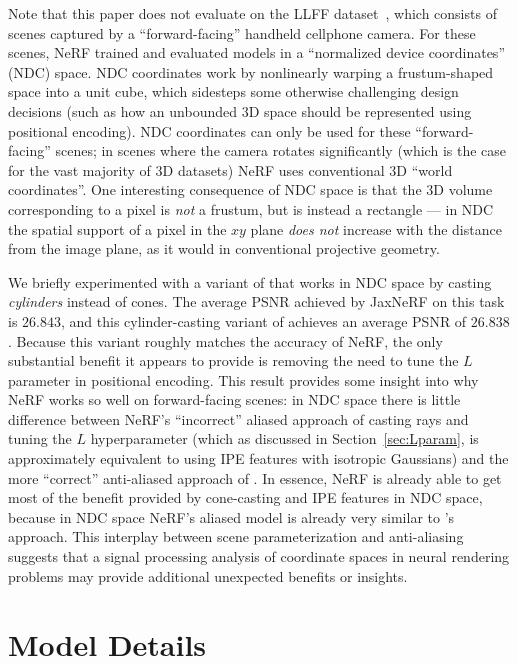 \documentclass[10pt,twocolumn,letterpaper]{article}
\begin{document}
Note that this paper does not evaluate on the LLFF dataset~\cite{mildenhall2019}, which consists of scenes captured by a ``forward-facing'' handheld cellphone camera. For these scenes, NeRF trained and evaluated models in a ``normalized device coordinates'' (NDC) space. NDC coordinates work by nonlinearly warping a frustum-shaped space into a unit cube, which sidesteps some otherwise challenging design decisions (such as how an unbounded 3D space should be represented using positional encoding). NDC coordinates can only be used for these ``forward-facing'' scenes; in scenes where the camera rotates significantly (which is the case for the vast majority of 3D datasets) NeRF uses conventional 3D ``world coordinates''.
One interesting consequence of NDC space is that the 3D volume corresponding to a pixel is \emph{not} a frustum, but is instead a rectangle --- in NDC the spatial support of a pixel in the $xy$ plane \emph{does not} increase with the distance from the image plane, as it would in conventional projective geometry.

We briefly experimented with a variant of \shortmodelnamelower that works in NDC space by casting \emph{cylinders} instead of cones.
The average PSNR achieved by JaxNeRF on this task is $26.843$, and this cylinder-casting variant of \shortmodelnamelower achieves an average PSNR of $26.838$. Because this \shortmodelnamelower variant roughly matches the accuracy of NeRF, the only substantial benefit it appears to provide is removing the need to tune the $L$ parameter in positional encoding. This result provides some insight into why NeRF works so well on forward-facing scenes: in NDC space there is little difference between NeRF's ``incorrect'' aliased approach of casting rays and tuning the $L$ hyperparameter (which as discussed in Section~\ref{sec:Lparam}, is approximately equivalent to using IPE features with isotropic Gaussians) and the more ``correct'' anti-aliased approach of \shortmodelnamelower. In essence, NeRF is already able to get most of the benefit provided by cone-casting and IPE features in NDC space, because in NDC space NeRF's aliased model is already very similar to \shortmodelnamelower's approach. This interplay between scene parameterization and anti-aliasing suggests that a signal processing analysis of coordinate spaces in neural rendering problems may provide additional unexpected benefits or insights.

\section{Model Details}
\end{document}
